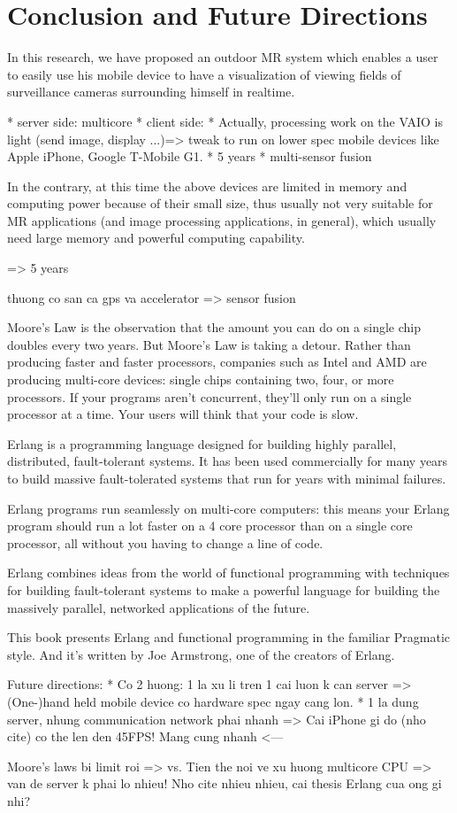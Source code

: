 \chapter{Conclusion and Future Directions}
\label{Chapter5}

In this research, we have proposed an outdoor MR system which enables a user to easily use his mobile device to have a visualization of viewing fields of surveillance cameras surrounding himself in realtime.

* server side: multicore
* client side:
	* Actually, processing work on the VAIO is light (send image, display ...)=> tweak to run on lower spec mobile devices like Apple iPhone, Google T-Mobile G1.
	* 5 years
* multi-sensor fusion


In the contrary, at this time the above devices are limited in memory and computing power because of their small size, thus usually not very suitable for MR applications (and image processing applications, in general), which usually need large memory and powerful computing capability.

=> 5 years

thuong co san ca gps va accelerator => sensor fusion

Moore's Law is the observation that the amount you can do on a single chip doubles every two years. But Moore's Law is taking a detour. Rather than producing faster and faster processors, companies such as Intel and AMD are producing multi-core devices: single chips containing two, four, or more processors. If your programs aren't concurrent, they'll only run on a single processor at a time. Your users will think that your code is slow.

Erlang is a programming language designed for building highly parallel, distributed, fault-tolerant systems. It has been used commercially for many years to build massive fault-tolerated systems that run for years with minimal failures.

Erlang programs run seamlessly on multi-core computers: this means your Erlang program should run a lot faster on a 4 core processor than on a single core processor, all without you having to change a line of code.

Erlang combines ideas from the world of functional programming with techniques for building fault-tolerant systems to make a powerful language for building the massively parallel, networked applications of the future.

This book presents Erlang and functional programming in the familiar Pragmatic style. And it's written by Joe Armstrong, one of the creators of Erlang.


Future directions:
* Co 2 huong: 1 la xu li tren 1 cai luon k can server => (One-)hand held mobile device co hardware spec ngay cang lon.
* 1 la dung server, nhung communication network phai nhanh => Cai iPhone gi do (nho cite) co the len den 45FPS! Mang cung nhanh <---

Moore's laws bi limit roi => vs. Tien the noi ve xu huong multicore CPU => van de server k phai lo nhieu!
Nho cite nhieu nhieu, cai thesis Erlang cua ong gi nhi?
